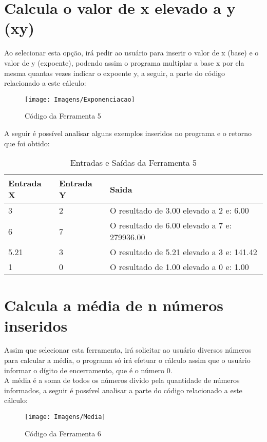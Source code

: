 \documentclass[12pt]{article}
\begin{document}
\newpage

\section{Calcula o valor de x elevado a y (xy)}
Ao selecionar esta opção, irá pedir ao usuário para inserir o valor de x (base) e o valor de y (expoente), podendo assim o programa multiplar a base x por ela mesma quantas vezes indicar o expoente y, a seguir, a parte do código relacionado a este cálculo:

\begin{figure}[!htb]
     \centering
     \texttt{[image: Imagens/Exponenciacao]}
     \caption{Código da Ferramenta 5}
     \label{Label de referência para a imagem}
\end{figure}

A seguir é possível analisar alguns exemplos inseridos no programa e o retorno que foi obtido:

\FloatBarrier
\begin{table}[ht]
\centering
\begin{tabular}{|l|l|l|}
\hline
\textbf{Entrada X} & \textbf{Entrada Y} & \textbf{Saida}\\
\hline
3 & 2 & O resultado de 3.00 elevado a 2 e: 6.00\\
6 & 7 & O resultado de 6.00 elevado a 7 e: 279936.00\\
5.21 & 3 & O resultado de 5.21 elevado a 3 e: 141.42\\
1 & 0 & O resultado de 1.00 elevado a 0 e: 1.00\\

\hline
\end{tabular}
\caption{Entradas e Saídas da Ferramenta 5}
\end{table} 

\newpage

\section{Calcula a média de n números inseridos}
Assim que selecionar esta ferramenta, irá solicitar ao usuário diversos números para calcular a média, o programa só irá efetuar o cálculo assim que o usuário informar o dígito de encerramento, que é o número 0. \\
A média é a soma de todos os números divido pela quantidade de números informados, a seguir é possível analisar a parte do código relacionado a este cálculo:

\begin{figure}[!htb]
     \centering
     \texttt{[image: Imagens/Media]}
     \caption{Código da Ferramenta 6}
     \label{Label de referência para a imagem}
\end{figure}
\end{document}
